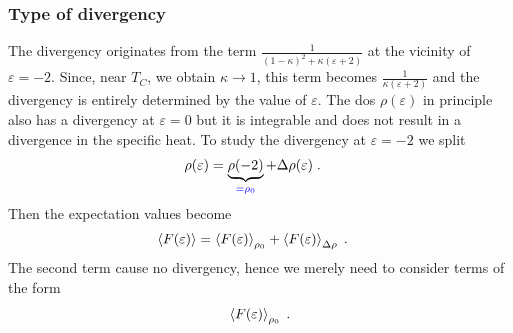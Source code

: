 \subsubsection{Type of divergency}
The divergency originates from the term $\frac{1}{(1-\kappa)^{2}+\kappa(\varepsilon+2)}$ at the vicinity of  $\varepsilon=-2$. Since, near $T_C$, we obtain $\kappa \to 1$, this term becomes $\frac{1}{\kappa(\varepsilon + 2)}$ and the divergency is entirely determined by the value of $\varepsilon$.
The dos $\rho(\varepsilon)$ in principle also has a divergency at $\varepsilon=0$ but it is integrable and does not result in a divergence
in the specific heat.
To study the divergency at $\varepsilon=-2$ we split 
%
\begin{align*}
\rho(\varepsilon) &= \underbrace{
\rho(-2)
}_{\color{blue} = \rho_{0}}  + \Delta \rho(\varepsilon)\;.
\end{align*}
%
Then the expectation values become
%
\begin{align*}
\left\langle F(\varepsilon)\right\rangle &= \left\langle F(\varepsilon)\right\rangle_{\rho_{0}} + 
\left\langle F(\varepsilon)\right\rangle_{\Delta\rho}\;.
\end{align*}
%
The second term cause no divergency, hence  we merely need to consider terms of the form
%
\begin{align}\label{eq:}
\left\langle F(\varepsilon)\right\rangle_{\rho_{0}}\;.
\end{align}
%
